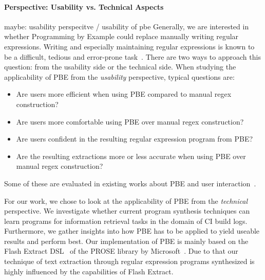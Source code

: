 \documentclass[\myrootdir/main.tex]{subfiles}
\begin{document}
\paragraph{Perspective: Usability vs. Technical Aspects} maybe: usability perspecitve / usability of pbe 
Generally, we are interested in whether Programming by Example could replace manually writing regular expressions.
Writing and especially maintaining regular expressions is known to be a difficult, tedious and error-prone task~\cite{michael2019regexes}.
There are two ways to approach this question: from the usability side or the technical side.
When studying the applicability of PBE from the \emph{usability} perspective, typical questions are:
\begin{itemize}
	\item Are users more efficient when using PBE compared to manual regex construction?
	\item Are users more comfortable using PBE over manual regex construction?
	\item Are users confident in the resulting regular expression program from PBE?
	\item Are the resulting extractions more or less accurate when using PBE over manual regex construction?
\end{itemize}
Some of these are evaluated in existing works about PBE and user interaction~\cite{mayer2015user,lau2009why-programming-by-demonstration,miller2001outlier}.

For our work, we chose to look at the applicability of PBE from the \emph{technical} perspective.
We investigate whether current program synthesis techniques can learn programs for information retrieval tasks in the domain of CI build logs.
Furthermore, we gather insights into how PBE has to be applied to yield useable results and perform best.
Our implementation of PBE is mainly based on the Flash Extract DSL~\cite{le2014flashextract:} of the PROSE library by Microsoft~\cite{prose2019webpage}.
Due to that our technique of text extraction through regular expression programs synthesized is highly influenced by the capabilities of Flash Extract.
\end{document}
